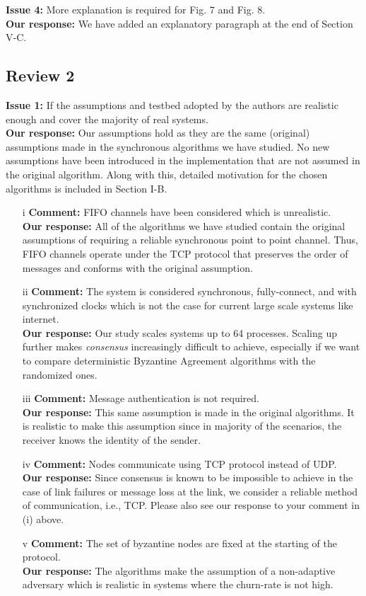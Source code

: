 \documentclass[a4paper]{article}
\begin{document}
\noindent \textbf{Issue 4:} More explanation is required for Fig. 7 and Fig. 8.\\
\textbf{Our response:} We have added an explanatory paragraph at the end of Section V-C.

\subsection{Review 2}
\textbf{Issue 1:} If the assumptions and testbed adopted by the authors are realistic enough and cover the majority of real systems. \\
\textbf{Our response:} Our assumptions hold as they are the same (original) assumptions made in the synchronous algorithms we have studied. No new assumptions have been introduced in the implementation that are not assumed in the original algorithm. Along with this, detailed motivation for the chosen algorithms is included in Section I-B.

\begin{enumerate}
\item[i] \textbf{Comment:} FIFO channels have been considered which is unrealistic.\\
\textbf{Our response:} All of the algorithms we have studied contain the original assumptions of requiring a reliable synchronous point to point channel. Thus, FIFO channels operate under the TCP protocol that preserves the order of messages and conforms with the original assumption.
\item[ii] \textbf{Comment:} The system is considered synchronous, fully-connect, and with synchronized clocks which is not the case for current large scale systems like internet.\\
\textbf{Our response:} Our study scales systems up to 64 processes. Scaling up further makes \textit{consensus} increasingly difficult to achieve, especially if we want to compare deterministic Byzantine Agreement algorithms with the randomized ones. 
\item[iii] \textbf{Comment:} Message authentication is not required.\\
\textbf{Our response:} This same assumption is made in the original algorithms. It is realistic to make this assumption since in majority of the scenarios, the receiver knows the identity of the sender.
\item[iv] \textbf{Comment:} Nodes communicate using TCP protocol instead of UDP.\\
\textbf{Our response:} Since consensus is known to be impossible to achieve in the case of link failures or message loss at the link, we consider a reliable method of communication, i.e., TCP. Please also see our response to your comment in (i) above.
\item[v] \textbf{Comment:} The set of byzantine nodes are fixed at the starting of the protocol.\\
\textbf{Our response:} The algorithms make the assumption of a non-adaptive adversary which is realistic in systems where the churn-rate is not high.
\end{enumerate}
\end{document}
